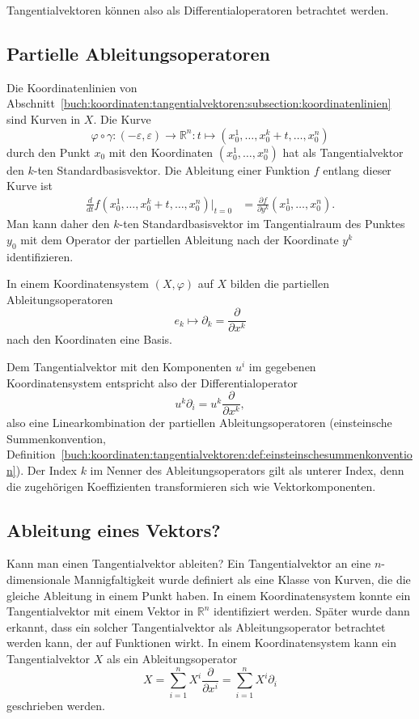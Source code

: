 Tangentialvektoren können also als Differentialoperatoren betrachtet
werden.

%
%
\subsection{Partielle Ableitungsoperatoren}
Die Koordinatenlinien von
Abschnitt~\ref{buch:koordinaten:tangentialvektoren:subsection:koordinatenlinien}
sind Kurven in $X$.
Die Kurve
\[
\varphi\circ\gamma
\colon
(-\varepsilon,\varepsilon)
\to
\mathbb{R}^n
:
t\mapsto (x_0^1,\dots,x_0^k+t,\dots,x_0^n)
\]
durch den Punkt $x_0$ mit den Koordinaten $(x_0^1,\dots,x_0^n)$
hat als Tangentialvektor den $k$-ten Standardbasisvektor.
Die Ableitung einer Funktion $f$ entlang dieser Kurve ist
\begin{align*}
\frac{d}{dt}
f(x_0^1,\dots,x_0^k+t,\dots,x_0^n)
\bigg|_{t=0}
&=
\frac{\partial f}{\partial y^k}(x_0^1,\dots,x_0^n).
\end{align*}
Man kann daher den $k$-ten Standardbasisvektor im Tangentialraum
des Punktes $y_0$ mit dem Operator der partiellen Ableitung nach
der Koordinate $y^k$ identifizieren.

\begin{satz}
In einem Koordinatensystem $(X,\varphi)$ auf $X$ bilden 
die partiellen Ableitungsoperatoren 
\[
e_k
\mapsto
\partial_k = \frac{\partial}{\partial x^k}
\]
nach den Koordinaten eine Basis.
\end{satz}

Dem Tangentialvektor mit den Komponenten $u^i$ im gegebenen
Koordinatensystem entspricht also der Differentialoperator
\[
u^k\partial_i = u^k\frac{\partial}{\partial x^k},
\]
also eine Linearkombination der partiellen Ableitungsoperatoren
(einsteinsche Summenkonvention, Definition~\ref{buch:koordinaten:tangentialvektoren:def:einsteinschesummenkonvention}).
Der Index $k$ im Nenner des Ableitungsoperators gilt als unterer
Index, denn die zugehörigen Koeffizienten transformieren sich
wie Vektorkomponenten.

%
%
\subsection{Ableitung eines Vektors?
\label{buch:koordinaten:diffop:subsection:vektorableitung}}
Kann man einen Tangentialvektor ableiten?
Ein Tangentialvektor an eine $n$-dimensionale Mannigfaltigkeit wurde
definiert als eine Klasse von Kurven, die die gleiche Ableitung in
einem Punkt haben.
In einem Koordinatensystem konnte ein Tangentialvektor mit einem
Vektor in $\mathbb{R}^n$ identifiziert werden.
Später wurde dann erkannt, dass ein solcher Tangentialvektor als
Ableitungsoperator betrachtet werden kann, der auf Funktionen
wirkt.
In einem Koordinatensystem kann ein Tangentialvektor $X$ als
ein Ableitungsoperator
\[
X
=
\sum_{i=1}^n
X^i \frac{\partial}{\partial x^i}
=
\sum_{i=1}^n
X^i \partial_i
\]
geschrieben werden.

